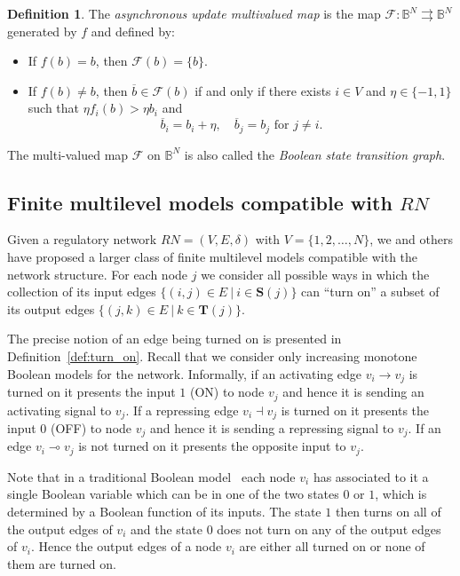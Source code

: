 \documentclass[12pt, notitlepage]{amsart}
\newcommand{\cF}{{\mathcal F}}
\theoremstyle{definition}
\newtheorem{defn}[thm]{Definition}
\newcommand{\Targets}{\mathbf{T}}
\newcommand{\Sources}{\mathbf{S}}
\newcommand{\ol}[1]{\overline{#1}}
\newcommand{\bbB}{\mathbb{B}}
\begin{document}
  \begin{defn}
    \label{def:Boolean_update}
    The \textit{asynchronous update multivalued map} is the map $\cF \colon \bbB^N \rightrightarrows \bbB^N$ generated by $f$ and defined by:
    \begin{itemize}
      \item If $f(b) = b$, then $\cF(b) = \{ b \}$.
      \item If $f(b) \neq b$, then $\ol{b} \in \cF(b)$ if and only if there exists $i \in V$ and $\eta \in \{-1, 1\}$ such that $\eta f_i(b) > \eta b_i$ and
        \[
          \ol{b}_i = b_i + \eta, \quad \ol{b}_j = b_j \mbox{ for } j\neq i.
        \]
    \end{itemize}
    The multi-valued map $\cF$ on $\bbB^N$ is also called the \textit{Boolean state transition graph}.
  \end{defn}

  \subsection{Finite multilevel models compatible with $RN$}
  \label{sec:multilevel_RN}

  Given a regulatory network $RN = (V, E, \delta)$ with $V = \{ 1, 2, \ldots, N \}$, we and others have proposed \cite{Ironi2011,Cummins16,Gedeon20,Richard2006} a larger class of finite multilevel models compatible with the network structure. For each node $j$ we consider all possible ways in which the collection of its input edges $\{ (i, j) \in E \ | \ i \in \Sources(j) \}$ can ``turn on'' a subset of its output edges $\{ (j, k) \in E \ | \ k \in \Targets(j) \}$.

  The precise notion of an edge being turned on is presented in Definition~\ref{def:turn_on}. Recall that we consider only increasing monotone Boolean models for the network. Informally, if an activating edge $v_i \to v_j$ is turned on it presents the input $1$ (\textsf{ON}) to node $v_j$ and hence it is sending an activating signal to $v_j$. If a repressing edge $v_i \dashv v_j$ is turned on it presents the input $0$ (\textsf{OFF}) to node $v_j$ and hence it is sending a repressing signal to $v_j$. If an edge $v_i \multimap v_j$ is not turned on it presents the opposite input to $v_j$.

  Note that in a traditional Boolean model~\cite{glass:kaufman:73,glass:kaufman:73,Thomas95,Thomas1973} each node $v_i$ has associated to it a single Boolean variable which can be in one of the two states $0$ or $1$, which is determined by a Boolean function of its inputs. The state $1$ then turns on all of the output edges of $v_i$ and the state $0$ does not turn on any of the output edges of $v_i$. Hence the output edges of a node $v_i$ are either all turned on or none of them are turned on.
\end{document}
